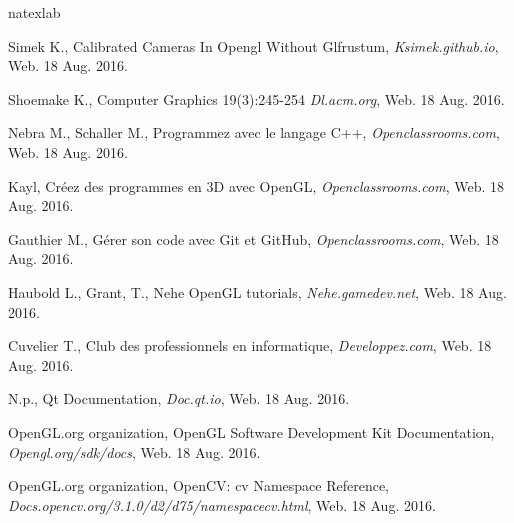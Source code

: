 \documentclass[12pt]{report}
\begin{document}
\begin{thebibliography}{2}
\expandafter\ifx\csname natexlab\endcsname\relax\def\natexlab#1{#1}\fi

\bibitem[Simek 2013]{}
Simek K., Calibrated Cameras In Opengl Without Glfrustum,
\newblock \textit{Ksimek.github.io}, Web. 18 Aug. 2016.

\bibitem[Shoemake 1985]{}
Shoemake K., Computer Graphics 19(3):245-254
\newblock \textit{Dl.acm.org}, Web. 18 Aug. 2016.


\bibitem[Nebra 2015]{}
Nebra M., Schaller M., Programmez avec le langage C++,
\newblock \textit{Openclassrooms.com}, Web. 18 Aug. 2016.

\bibitem[Kayl 2013]{}
Kayl, Créez des programmes en 3D avec OpenGL,
\newblock \textit{Openclassrooms.com}, Web. 18 Aug. 2016.

\bibitem[Gauthier 2015]{}
Gauthier M., Gérer son code avec Git et GitHub,
\newblock \textit{Openclassrooms.com}, Web. 18 Aug. 2016.


\bibitem[Haubold 2015]{}
Haubold L., Grant, T., Nehe OpenGL tutorials,
\newblock \textit{Nehe.gamedev.net}, Web. 18 Aug. 2016.

\bibitem[Cuvelier 2016]{}
Cuvelier T., Club des professionnels en informatique,
\newblock \textit{Developpez.com}, Web. 18 Aug. 2016.

\bibitem[Qt organization 2016]{}
N.p., Qt Documentation,
\newblock \textit{Doc.qt.io}, Web. 18 Aug. 2016.

OpenGL.org organization, OpenGL Software Development Kit Documentation,
\newblock \textit{Opengl.org/sdk/docs}, Web. 18 Aug. 2016.

OpenGL.org organization, OpenCV: cv Namespace Reference,
\newblock \textit{Docs.opencv.org/3.1.0/d2/d75/namespacecv.html}, Web. 18 Aug. 2016.
\end{thebibliography}
\end{document}
